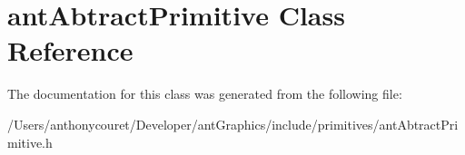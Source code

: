 \hypertarget{classant_abtract_primitive}{\section{ant\+Abtract\+Primitive Class Reference}
\label{classant_abtract_primitive}
}


The documentation for this class was generated from the following file\+:\begin{DoxyCompactItemize}
\item 
/\+Users/anthonycouret/\+Developer/ant\+Graphics/include/primitives/ant\+Abtract\+Primitive.\+h\end{DoxyCompactItemize}
